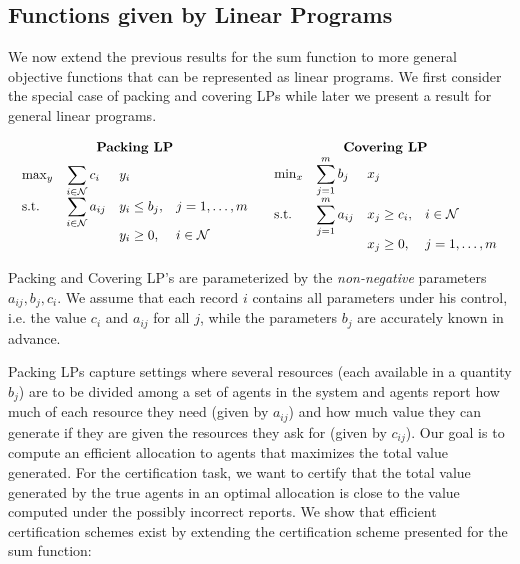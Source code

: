 
\subsection{Functions given by Linear Programs}
\label{ssubs:coverLP}

  We now extend the previous results for the sum function to more general objective functions that can be represented 
as linear programs. We first consider the special case of packing and covering LPs while later we present a result for
general linear programs.

$$
  \begin{array}{cc}
 	
\textbf{Packing LP} &
\textbf{Covering LP} \\
  
  \begin{array}{llll}
    \max_y  & \displaystyle\sum\limits_{i \in \Workers} c_{i} & y_{i} & \\
    \text{s.t.} & \displaystyle\sum\limits_{i \in \Workers} a_{ij} & y_{i} \le b_{j},  &j = 1, \dots, m \\
    & & y_i \ge 0, & i \in \Workers
  \end{array}
  
  &
  \begin{array}{llll}
      \min_x  & \displaystyle\sum\limits_{j = 1}^m b_{j} & x_{j} & \\
      \text{s.t.} & \displaystyle\sum\limits_{j = 1}^m a_{ij} & x_{j} \ge c_{i},  & i \in \Workers \\
      & & x_j \ge 0, & j = 1, \dots, m
    \end{array}
  \end{array}
$$

  Packing and Covering LP's are parameterized by the \emph{non-negative} parameters $a_{ij}, b_j, c_i$. We assume that
each record $i$ contains all parameters under his control, i.e. the value $c_i$ and $a_{ij}$ for all $j$, while the 
parameters $b_j$ are accurately known in advance.

  Packing LPs capture settings where several resources (each available in a quantity $b_j$) are to be divided among 
a set of agents in the system and agents report how much of each resource they need (given by $a_{ij}$) and how much
value they can generate if they are given the resources they ask for (given by $c_{ij}$). Our goal is to compute an
efficient allocation to agents that maximizes the total value generated. For the certification task, we want to 
certify that the total value generated by the true agents in an optimal allocation is close to the value computed 
under the possibly incorrect reports. We show that efficient certification schemes exist by extending the 
certification scheme presented for the sum function:

